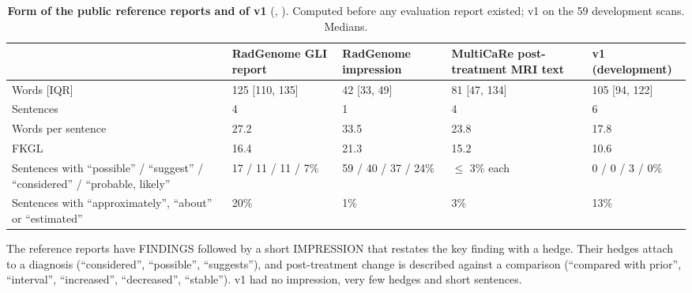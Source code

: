 \documentclass[11pt,a4paper]{article}
\begin{document}
\begin{table}[H]
\centering
\footnotesize
\renewcommand{\thetable}{S36}\renewcommand{\theHtable}{S36}
\caption{\textbf{Form of the public reference reports and of v1} (,
). Computed before any evaluation report existed; v1 on the 59 development scans.
Medians.}
\label{tab:S36}
\begin{tabularx}{\linewidth}{@{}L R{2.2cm} R{2.2cm} R{2.6cm} R{2.6cm}@{}}
\toprule
 & RadGenome GLI report & RadGenome impression & MultiCaRe post-treatment MRI text & v1 (development) \\
\midrule
Words [IQR] & 125 [110, 135] & 42 [33, 49] & 81 [47, 134] & 105 [94, 122] \\
Sentences & 4 & 1 & 4 & 6 \\
Words per sentence & 27.2 & 33.5 & 23.8 & 17.8 \\
FKGL & 16.4 & 21.3 & 15.2 & 10.6 \\
Sentences with ``possible'' / ``suggest'' / ``considered'' / ``probable, likely'' & 17 / 11 / 11 / 7\% & 59 / 40 / 37 / 24\% & $\leq$ 3\% each & 0 / 0 / 3 / 0\% \\
Sentences with ``approximately'', ``about'' or ``estimated'' & 20\% & 1\% & 3\% & 13\% \\
\bottomrule
\end{tabularx}
\end{table}

The reference reports have FINDINGS followed by a short IMPRESSION that restates the key finding with a hedge. Their
hedges attach to a diagnosis (``considered'', ``possible'', ``suggests''), and post-treatment change is described
against a comparison (``compared with prior'', ``interval'', ``increased'', ``decreased'', ``stable''). v1 had no
impression, very few hedges and short sentences.
\end{document}
